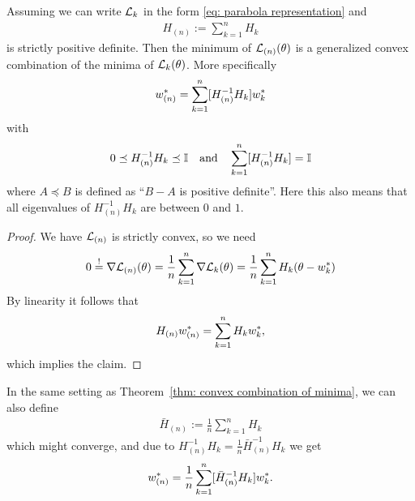 \begin{theorem}
	\label{thm: convex combination of minima}
	Assuming we can write \(\mathcal{L}_k\) in the form \eqref{eq: parabola representation} and
	\begin{align*}
		H_{(n)}:=\sum_{k=1}^n H_k
	\end{align*}
	is strictly positive definite. Then the minimum of \(\mathcal{L}_{(n)}(\theta)\) is a
	generalized convex combination of the minima of \(\mathcal{L}_k(\theta)\). More
	specifically
	\begin{align*}
		w^*_{(n)} = \sum_{k=1}^n [H_{(n)}^{-1} H_k] w^*_{k}
	\end{align*}
	with
	\begin{align*}
		0\preceq H_{(n)}^{-1}H_k\preceq \mathbb{I}
		\quad \text{and}\quad
		\sum_{k=1}^n [H_{(n)}^{-1} H_k] = \mathbb{I}
	\end{align*}
	where \(A\preceq B\) is defined as ``\(B-A\) is positive definite''. Here
	this also means that all eigenvalues of \(H_{(n)}^{-1}H_k\) are between
	\(0\) and \(1\).
\end{theorem}
\begin{proof}
	We have \(\mathcal{L}_{(n)}\) is strictly convex, so we need
	\begin{align*}
		0 \overset!= \nabla\mathcal{L}_{(n)}(\theta)
		=\frac1n \sum_{k=1}^n \nabla\mathcal{L}_k(\theta)
		= \frac1n \sum_{k=1}^n H_k(\theta - w^*_k)
	\end{align*}
	By linearity it follows that
	\begin{align*}
		H_{(n)} w^*_{(n)} = \sum_{k=1}^n H_k w^*_k,
	\end{align*}
	which implies the claim.
\end{proof}

\begin{corollary}
	In the same setting as Theorem~\ref{thm: convex combination of minima}, we
	can also define
	\begin{align*}
		\bar{H}_{(n)} := \frac1n\sum_{k=1}^n H_k
	\end{align*}
	which might converge, and due to \(H_{(n)}^{-1}H_k = \tfrac1n\bar{H}_{(n)}^{-1}H_k\)
	we get
	\begin{align*}
		w^*_{(n)}
		= \frac1n\sum_{k=1}^n [\bar{H}_{(n)}^{-1} H_k] w^*_{k}.
	\end{align*}
\end{corollary}
